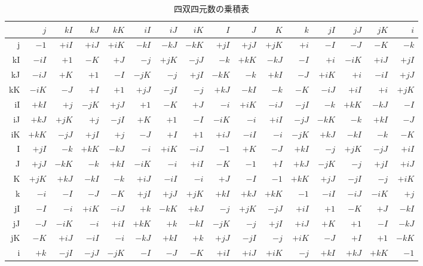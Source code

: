 \documentclass[a4paper,12pt,notitlepage]{jsreport}
\begin{document}
\clearpage

\begin{table}[ht]
  \begin{center}
    \caption{四双四元数の乗積表}
    \small
    \begin{tabular}{r|rrrrrrrrrrrrrrr}
      &$j$&$kI$&$kJ$&$kK$&$iI$&$iJ$&$iK$&$I$&$J$&$K$&$k$&$jI$&$jJ$&$jK$&$i$ \\ \hline
      j&$-1$&$+iI$&$+iJ$&$+iK$&$-kI$&$-kJ$&$-kK$&$+jI$&$+jJ$&$+jK$&$+i$&$-I$&$-J$&$-K$&$-k$ \\ \hline
      kI&$-iI$&$+1$&$-K$&$+J$&$-j$&$+jK$&$-jJ$&$-k$&$+kK$&$-kJ$&$-I$&$+i$&$-iK$&$+iJ$&$+jI$ \\ \hline
      kJ&$-iJ$&$+K$&$+1$&$-I$&$-jK$&$-j$&$+jI$&$-kK$&$-k$&$+kI$&$-J$&$+iK$&$+i$&$-iI$&$+jJ$ \\ \hline
      kK&$-iK$&$-J$&$+I$&$+1$&$+jJ$&$-jI$&$-j$&$+kJ$&$-kI$&$-k$&$-K$&$-iJ$&$+iI$&$+i$&$+jK$ \\ \hline
      iI&$+kI$&$+j$&$-jK$&$+jJ$&$+1$&$-K$&$+J$&$-i$&$+iK$&$-iJ$&$-jI$&$-k$&$+kK$&$-kJ$&$-I$ \\ \hline
      iJ&$+kJ$&$+jK$&$+j$&$-jI$&$+K$&$+1$&$-I$&$-iK$&$-i$&$+iI$&$-jJ$&$-kK$&$-k$&$+kI$&$-J$ \\ \hline
      iK&$+kK$&$-jJ$&$+jI$&$+j$&$-J$&$+I$&$+1$&$+iJ$&$-iI$&$-i$&$-jK$&$+kJ$&$-kI$&$-k$&$-K$ \\ \hline
      I&$+jI$&$-k$&$+kK$&$-kJ$&$-i$&$+iK$&$-iJ$&$-1$&$+K$&$-J$&$+kI$&$-j$&$+jK$&$-jJ$&$+iI$ \\ \hline
      J&$+jJ$&$-kK$&$-k$&$+kI$&$-iK$&$-i$&$+iI$&$-K$&$-1$&$+I$&$+kJ$&$-jK$&$-j$&$+jI$&$+iJ$ \\ \hline
      K&$+jK$&$+kJ$&$-kI$&$-k$&$+iJ$&$-iI$&$-i$&$+J$&$-I$&$-1$&$+kK$&$+jJ$&$-jI$&$-j$&$+iK$ \\ \hline
      k&$-i$&$-I$&$-J$&$-K$&$+jI$&$+jJ$&$+jK$&$+kI$&$+kJ$&$+kK$&$-1$&$-iI$&$-iJ$&$-iK$&$+j$ \\ \hline
      jI&$-I$&$-i$&$+iK$&$-iJ$&$+k$&$-kK$&$+kJ$&$-j$&$+jK$&$-jJ$&$+iI$&$+1$&$-K$&$+J$&$-kI$ \\ \hline
      jJ&$-J$&$-iK$&$-i$&$+iI$&$+kK$&$+k$&$-kI$&$-jK$&$-j$&$+jI$&$+iJ$&$+K$&$+1$&$-I$&$-kJ$ \\ \hline
      jK&$-K$&$+iJ$&$-iI$&$-i$&$-kJ$&$+kI$&$+k$&$+jJ$&$-jI$&$-j$&$+iK$&$-J$&$+I$&$+1$&$-kK$ \\ \hline
      i&$+k$&$-jI$&$-jJ$&$-jK$&$-I$&$-J$&$-K$&$+iI$&$+iJ$&$+iK$&$-j$&$+kI$&$+kJ$&$+kK$&$-1$ \\ \hline
    \end{tabular}
  \end{center}
\end{table}
\end{document}

